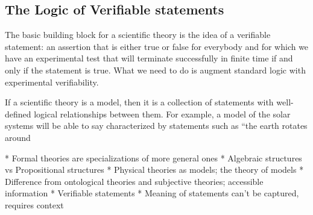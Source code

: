 \documentclass[twocolumn]{article}
\begin{document}
\subsection{The Logic of Verifiable statements}

The basic building block for a scientific theory is the idea of a verifiable statement: an assertion that is either true or false for everybody and for which we have an experimental test that will terminate successfully in finite time if and only if the statement is true. What we need to do is augment standard logic with experimental verifiability.


If a scientific theory is a model, then it is a collection of statements with well-defined logical relationships between them. For example, a model of the solar systems will be able to say characterized by statements such as ``the earth rotates around

* Formal theories are specializations of more general ones
* Algebraic structures vs Propositional structures
* Physical theories as models; the theory of models
* Difference from ontological theories and subjective theories; accessible information
* Verifiable statements
* Meaning of statements can't be captured, requires context
\end{document}
